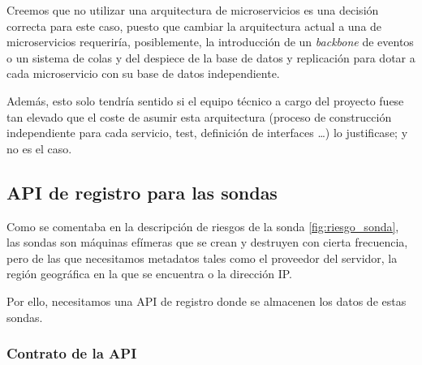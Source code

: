 Creemos que no utilizar una arquitectura de microservicios es una decisión correcta para este caso, puesto que cambiar la arquitectura
actual a una de microservicios requeriría, posiblemente, la introducción de un \emph{backbone} de eventos o un sistema de colas y del despiece de la
base de datos y replicación para dotar a cada microservicio con su base de datos independiente.

Además, esto solo tendría sentido si el equipo técnico a cargo del proyecto fuese tan elevado que el coste de asumir esta arquitectura
(proceso de construcción independiente para cada servicio, test, definición de interfaces \ldots) lo justificase; y no es el caso.

\subsection{API de registro para las sondas}
\label{subsec:sinker-registry-api}

Como se comentaba en la descripción de riesgos de la sonda \ref{fig:riesgo_sonda}, las sondas son máquinas efímeras que se
crean y destruyen con cierta frecuencia, pero de las que necesitamos metadatos tales como el proveedor del servidor, 
la región geográfica en la que se encuentra o la dirección IP.

Por ello, necesitamos una API de registro donde se almacenen los datos de estas sondas. 

\subsubsection{Contrato de la API}

